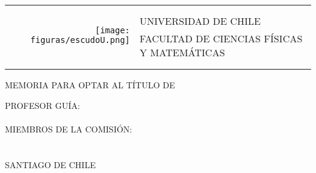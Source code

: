 
\newpage
\thispagestyle{empty}

\begin{flushleft}
	\begin{tabular}{rl}
	\multirow{5}{*}{\texttt{[image: figuras/escudoU.png]}} &\\
	& \\
	& UNIVERSIDAD DE CHILE\\
	& FACULTAD DE CIENCIAS FÍSICAS Y MATEMÁTICAS\\
	& \Dpto\\
	& \\
	\end{tabular}
\end{flushleft}

\begin{center}

	\vspace{4cm}

	\Memtitle

	\vspace{2cm}

	MEMORIA PARA OPTAR AL TÍTULO DE\\
	\Tipomemoria

	\vspace{2cm}

	\AuthorFirst

	\vspace{1cm}
	PROFESOR GUÍA:\\
	\Profesor \\
	\vspace{1cm}
	MIEMBROS DE LA COMISIÓN:\\
	\Coguia \\
	\Integrante \\
	\vfill
	SANTIAGO DE CHILE\\
	\Fecha
\end{center}

